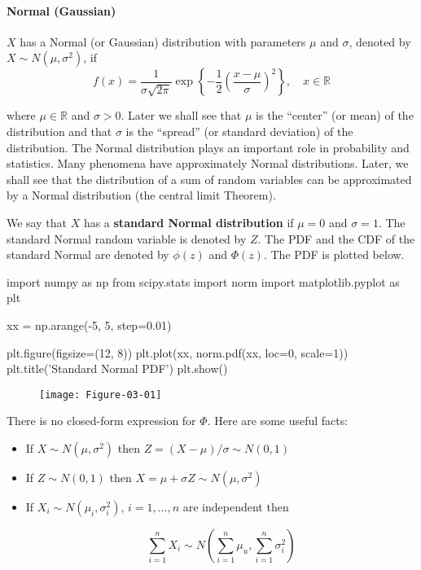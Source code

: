 \paragraph{Normal (Gaussian)}\label{normal-gaussian}

\(X\) has a Normal (or Gaussian) distribution with parameters \(\mu\) and \(\sigma\), denoted by \(X \sim N(\mu, \sigma^{2})\), if
\[
f(x) = \frac{1}{\sigma \sqrt{2 \pi}} \exp \left\{ -\frac{1}{2} \left( \frac{x - \mu}{\sigma} \right)^{2}\right\}, \quad x \in \mathbb{R}
\]

where \(\mu \in \mathbb{R}\) and \(\sigma > 0\). Later we shall see that \(\mu\) is the ``center'' (or mean) of the distribution and that \(\sigma\) is the ``spread'' (or standard deviation) of the distribution. The Normal distribution plays an important role in probability and statistics. Many phenomena have approximately Normal distributions. Later, we shall see that the distribution of a sum of random variables can be approximated by a Normal distribution (the central limit Theorem).

We say that \(X\) has a \textbf{standard Normal distribution} if \(\mu = 0\) and \(\sigma = 1\). The standard Normal random variable is denoted by \(Z\). The PDF and the CDF of the standard Normal are denoted by \(\phi(z)\) and \(\Phi(z)\). The PDF is plotted below.

\begin{python}
import numpy as np
from scipy.stats import norm
import matplotlib.pyplot as plt

xx = np.arange(-5, 5, step=0.01)

plt.figure(figsize=(12, 8))
plt.plot(xx, norm.pdf(xx, loc=0, scale=1))
plt.title('Standard Normal PDF')
plt.show()
\end{python}

\begin{figure}[H]
\centering
\texttt{[image: Figure-03-01]}
\end{figure}

There is no closed-form expression for \(\Phi\). Here are some useful facts:

\begin{itemize}
\item
  If \(X \sim N(\mu, \sigma^{2})\) then
  \(Z = (X - \mu) / \sigma \sim N(0, 1)\)
\item
  If \(Z \sim N(0, 1)\) then
  \(X = \mu + \sigma Z \sim N(\mu, \sigma^{2})\)
\item
  If \(X_{i} \sim N(\mu_{i}, \sigma_{i}^{2})\), \(i = 1, \dots, n\) are
  independent then

  \[ \sum_{i=1}^{n} X_{i} \sim N \left(\sum_{i=1}^{n} \mu_u, \sum_{i=1}^{n} \sigma_{i}^{2} \right) \]
\end{itemize}

